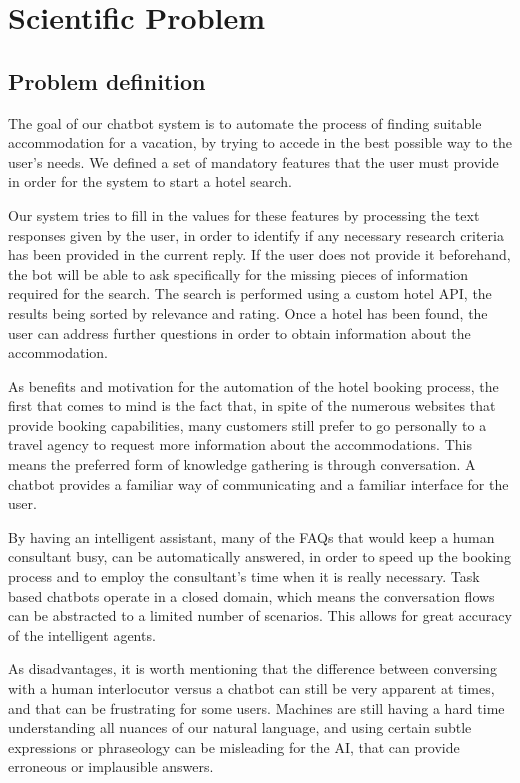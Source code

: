 \documentclass[runningheads,a4paper,11pt]{report}
\begin{document}
\chapter{Scientific Problem}
\label{section:scientificProblem}


\section{Problem definition}
\label{section:problemDefinition}


The goal of our chatbot system is to automate the process of finding suitable accommodation for a vacation, by trying to accede in the best possible way to the user's needs. We defined a set of mandatory features that the user must provide in order for the system to start a hotel search. 

Our system tries to fill in the values for these features by processing the text responses given by the user, in order to identify if any necessary research criteria has been provided in the current reply. If the user does not provide it beforehand, the bot will be able to ask specifically for the missing pieces of information required for the search.
The search is performed using a custom hotel API, the results being sorted by relevance and rating.
Once a hotel has been found, the user can address further questions in order to obtain information about the accommodation. 

As benefits and motivation for the automation of the hotel booking process, the first that comes to mind is the fact that, in spite of the numerous websites that provide booking capabilities, many customers still prefer to go personally to a travel agency to request more information about the accommodations. This means the preferred form of knowledge gathering is through conversation. A chatbot provides a familiar way of communicating and a familiar interface for the user. 

By having an intelligent assistant, many of the FAQs that would keep a human consultant busy, can be automatically answered, in order to speed up the booking process and to employ the consultant's time when it is really necessary. 
Task based chatbots operate in a closed domain, which means the conversation flows can be abstracted to a limited number of scenarios. This allows for great accuracy of the intelligent agents.

As disadvantages, it is worth mentioning that the difference between conversing with a human interlocutor versus a chatbot can still be very apparent at times, and that can be frustrating for some users. Machines are still having a hard time understanding all nuances of our natural language, and using certain subtle expressions or phraseology can be misleading for the AI, that can provide erroneous or implausible answers.
\end{document}
